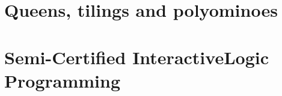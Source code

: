 \documentclass[a4paper,twoside,symmetric]{tufte-book}
\begin{document}
\chapter{Queens, tilings and polyominoes}
\label{ch:queens-tilings-polyominoes}



\chapter{Semi-Certified Interactive\newline Logic Programming} 
\label{ch:scilp}










\printindex
\end{document}
